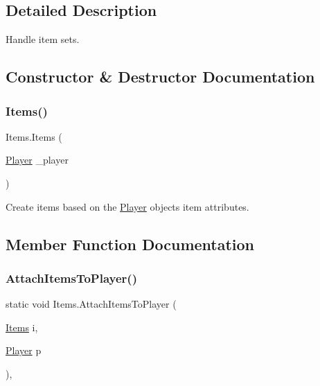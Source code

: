 \subsection{Detailed Description}
Handle item sets. 

\subsection{Constructor \& Destructor Documentation}
\mbox{\label{class_items_a78d62b542929857f6e65b3ed91fb31ee}} 
\subsubsection{\texorpdfstring{Items()}{Items()}}
{\footnotesize\ttfamily Items.\+Items (\begin{DoxyParamCaption}\item[{\mbox{\hyperlink{class_player}{Player}}}]{\+\_\+player }\end{DoxyParamCaption})\hspace{0.3cm}{\ttfamily [inline]}}



Create items based on the \mbox{\hyperlink{class_player}{Player}} object\textquotesingle{}s item attributes. 



\subsection{Member Function Documentation}
\mbox{\label{class_items_a0fed8123fbaa68d1d310cdb28cb1793d}} 
\subsubsection{\texorpdfstring{AttachItemsToPlayer()}{AttachItemsToPlayer()}}
{\footnotesize\ttfamily static void Items.\+Attach\+Items\+To\+Player (\begin{DoxyParamCaption}\item[{\mbox{\hyperlink{class_items}{Items}}}]{i,  }\item[{\mbox{\hyperlink{class_player}{Player}}}]{p }\end{DoxyParamCaption})\hspace{0.3cm}{\ttfamily [inline]}, {\ttfamily [static]}}



